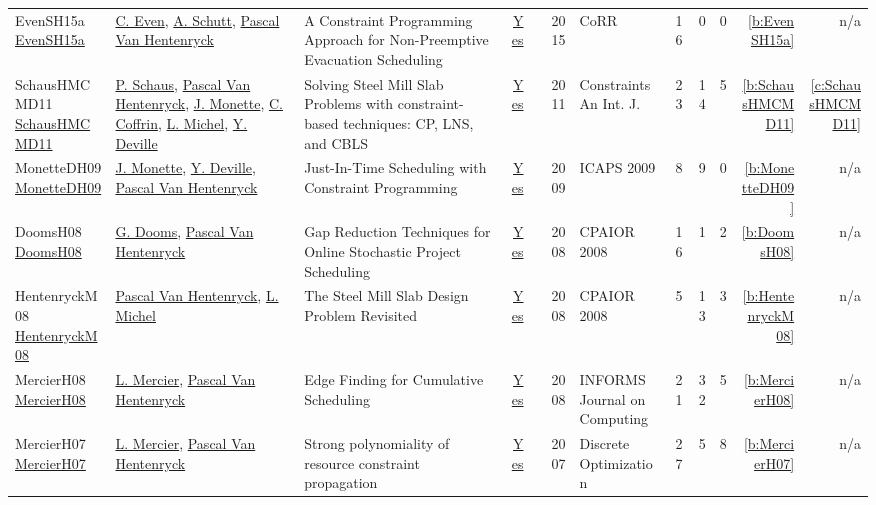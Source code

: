 {\begin{longtable}{>{\raggedright\arraybackslash}p{3cm}>{\raggedright\arraybackslash}p{6cm}>{\raggedright\arraybackslash}p{6.5cm}rrrp{2.5cm}rrrrr}
EvenSH15a \href{http://arxiv.org/abs/1505.02487}{EvenSH15a} & \hyperref[auth:a219]{C. Even}, \hyperref[auth:a125]{A. Schutt}, \hyperref[auth:a149]{Pascal Van Hentenryck} & A Constraint Programming Approach for Non-Preemptive Evacuation Scheduling & \href{../works/EvenSH15a.pdf}{Yes} & \cite{EvenSH15a} & 2015 & CoRR & 16 & 0 & 0 & \ref{b:EvenSH15a} & n/a\\
SchausHMCMD11 \href{https://doi.org/10.1007/s10601-010-9100-5}{SchausHMCMD11} & \hyperref[auth:a148]{P. Schaus}, \hyperref[auth:a149]{Pascal Van Hentenryck}, \hyperref[auth:a150]{J. Monette}, \hyperref[auth:a151]{C. Coffrin}, \hyperref[auth:a32]{L. Michel}, \hyperref[auth:a152]{Y. Deville} & Solving Steel Mill Slab Problems with constraint-based techniques: CP, LNS, and {CBLS} & \href{../works/SchausHMCMD11.pdf}{Yes} & \cite{SchausHMCMD11} & 2011 & Constraints An Int. J. & 23 & 14 & 5 & \ref{b:SchausHMCMD11} & \ref{c:SchausHMCMD11}\\
MonetteDH09 \href{http://aaai.org/ocs/index.php/ICAPS/ICAPS09/paper/view/712}{MonetteDH09} & \hyperref[auth:a150]{J. Monette}, \hyperref[auth:a152]{Y. Deville}, \hyperref[auth:a149]{Pascal Van Hentenryck} & Just-In-Time Scheduling with Constraint Programming & \href{../works/MonetteDH09.pdf}{Yes} & \cite{MonetteDH09} & 2009 & ICAPS 2009 & 8 & 9 & 0 & \ref{b:MonetteDH09} & n/a\\
DoomsH08 \href{https://doi.org/10.1007/978-3-540-68155-7_8}{DoomsH08} & \hyperref[auth:a362]{G. Dooms}, \hyperref[auth:a149]{Pascal Van Hentenryck} & Gap Reduction Techniques for Online Stochastic Project Scheduling & \href{../works/DoomsH08.pdf}{Yes} & \cite{DoomsH08} & 2008 & CPAIOR 2008 & 16 & 1 & 2 & \ref{b:DoomsH08} & n/a\\
HentenryckM08 \href{https://doi.org/10.1007/978-3-540-68155-7_41}{HentenryckM08} & \hyperref[auth:a149]{Pascal Van Hentenryck}, \hyperref[auth:a32]{L. Michel} & The Steel Mill Slab Design Problem Revisited & \href{../works/HentenryckM08.pdf}{Yes} & \cite{HentenryckM08} & 2008 & CPAIOR 2008 & 5 & 13 & 3 & \ref{b:HentenryckM08} & n/a\\
MercierH08 \href{http://dx.doi.org/10.1287/ijoc.1070.0226}{MercierH08} & \hyperref[auth:a858]{L. Mercier}, \hyperref[auth:a149]{Pascal Van Hentenryck} & Edge Finding for Cumulative Scheduling & \href{../works/MercierH08.pdf}{Yes} & \cite{MercierH08} & 2008 & INFORMS Journal on Computing & 21 & 32 & 5 & \ref{b:MercierH08} & n/a\\
MercierH07 \href{http://dx.doi.org/10.1016/j.disopt.2007.01.001}{MercierH07} & \hyperref[auth:a858]{L. Mercier}, \hyperref[auth:a149]{Pascal Van Hentenryck} & Strong polynomiality of resource constraint propagation & \href{../works/MercierH07.pdf}{Yes} & \cite{MercierH07} & 2007 & Discrete Optimization & 27 & 5 & 8 & \ref{b:MercierH07} & n/a\\

\end{longtable}}
